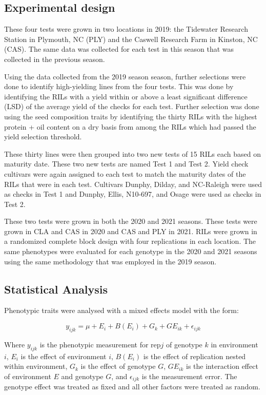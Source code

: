 \documentclass[Agronomy,article,submit,moreauthors,pdftex]{mdpi}
\begin{document}
\hypertarget{experimental-design}{%
\subsection{Experimental design}\label{experimental-design}}

These four tests were grown in two locations in 2019: the Tidewater
Research Station in Plymouth, NC (PLY) and the Caswell Research Farm in
Kinston, NC (CAS). The same data was collected for each test in this
season that was collected in the previous season.

Using the data collected from the 2019 season season, further selections
were done to identify high-yielding lines from the four tests. This was
done by identifying the RILs with a yield within or above a least
significant difference (LSD) of the average yield of the checks for each
test. Further selection was done using the seed composition traits by
identifying the thirty RILs with the highest protein + oil content on a
dry basis from among the RILs which had passed the yield selection
threshold.

These thirty lines were then grouped into two new tests of 15 RILs each
based on maturity date. These two new tests are named Test 1 and Test 2.
Yield check cultivars were again assigned to each test to match the
maturity dates of the RILs that were in each test. Cultivars Dunphy,
Dilday, and NC-Raleigh were used as checks in Test 1 and Dunphy, Ellis,
N10-697, and Osage were used as checks in Test 2.

These two tests were grown in both the 2020 and 2021 seasons. These
tests were grown in CLA and CAS in 2020 and CAS and PLY in 2021. RILs
were grown in a randomized complete block design with four replications
in each location. The same phenotypes were evaluated for each genotype
in the 2020 and 2021 seasons using the same methodology that was
employed in the 2019 season.

\hypertarget{statistical-analysis}{%
\subsection{Statistical Analysis}\label{statistical-analysis}}

Phenotypic traits were analysed with a mixed effects model with the
form:

\[y_{ijk} = \mu + E_i + B(E_i) + G_k + GE_{ik} + \epsilon_{ijk}\]

Where \(y_{ijk}\) is the phenotypic measurement for rep\(j\) of genotype
\(k\) in environment \(i\), \(E_i\) is the effect of environment \(i\),
\(B(E_i)\) is the effect of replication nested within environment,
\(G_k\) is the effect of genotype \(G\), \(GE_{ik}\) is the interaction
effect of environment \(E\) and genotype \(G\), and \(\epsilon_{ijk}\)
is the measurement error. The genotype effect was treated as fixed and
all other factors were treated as random.
\end{document}
